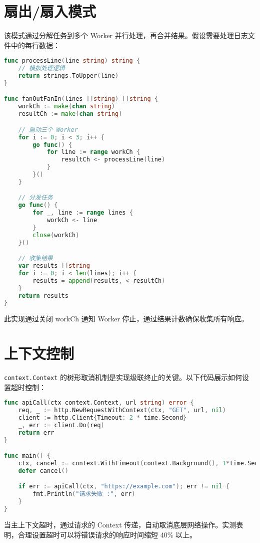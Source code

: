\section{扇出/扇入模式}
该模式通过分解任务到多个 Worker 并行处理，再合并结果。假设需要处理日志文件中的每行数据：\par
\begin{lstlisting}[language=go]
func processLine(line string) string {
    // 模拟处理逻辑
    return strings.ToUpper(line)
}

func fanOutFanIn(lines []string) []string {
    workCh := make(chan string)
    resultCh := make(chan string)

    // 启动三个 Worker
    for i := 0; i < 3; i++ {
        go func() {
            for line := range workCh {
                resultCh <- processLine(line)
            }
        }()
    }

    // 分发任务
    go func() {
        for _, line := range lines {
            workCh <- line
        }
        close(workCh)
    }()

    // 收集结果
    var results []string
    for i := 0; i < len(lines); i++ {
        results = append(results, <-resultCh)
    }
    return results
}
\end{lstlisting}
此实现通过关闭 workCh 通知 Worker 停止，通过结果计数确保收集所有响应。\par
\section{上下文控制}
\verb!context.Context! 的树形取消机制是实现级联终止的关键。以下代码展示如何设置超时控制：\par
\begin{lstlisting}[language=go]
func apiCall(ctx context.Context, url string) error {
    req, _ := http.NewRequestWithContext(ctx, "GET", url, nil)
    client := http.Client{Timeout: 2 * time.Second}
    _, err := client.Do(req)
    return err
}

func main() {
    ctx, cancel := context.WithTimeout(context.Background(), 1*time.Second)
    defer cancel()

    if err := apiCall(ctx, "https://example.com"); err != nil {
        fmt.Println("请求失败 :", err)
    }
}
\end{lstlisting}
当主上下文超时，通过请求的 Context 传递，自动取消底层网络操作。实测表明，合理设置超时可以将错误请求的响应时间缩短 40\%{} 以上。\par
